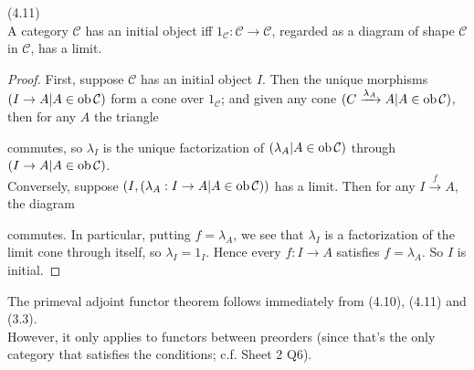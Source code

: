 \documentclass[a4paper]{article}
\begin{document}
\begin{lemma} (4.11)\\
    A category $\mathcal{C}$ has an initial object iff $1_{\mathcal{C}}:\mathcal{C} \to \mathcal{C}$, regarded as a diagram of shape $\mathcal{C}$ in $\mathcal{C}$, has a limit.
    \begin{proof}
        First, suppose $\mathcal{C}$ has an initial object $I$. Then the unique morphisms $(I \to A | A \in \operatorname{ob}\mathcal{C})$ form a cone over $1_{\mathcal{C}}$; and given any cone $(C \xrightarrow{\lambda_A} A |A \in \operatorname{ob}\mathcal{C})$, then for any $A$ the triangle 
        commutes, so $\lambda_I$ is the unique factorization of $(\lambda_A|A \in \operatorname{ob}\mathcal{C})$ through $(I \to A|A\in\operatorname{ob}\mathcal{C})$.\\
        Conversely, suppose $(I,(\lambda_A:I \to A|A \in \operatorname{ob}\mathcal{C}))$ has a limit. Then for any $I \xrightarrow{f} A$, the diagram
        commutes. In particular, putting $f = \lambda_A$, we see that $\lambda_I$ is a factorization of the limit cone through itself, so $\lambda_I = 1_I$. Hence every $f:I \to A$ satisfies $f=\lambda_A$. So $I$ is initial.
    \end{proof}
\end{lemma}

The primeval adjoint functor theorem follows immediately from (4.10), (4.11) and (3.3).\\
However, it only applies to functors between preorders (since that's the only category that satisfies the conditions; c.f. Sheet 2 Q6).
\end{document}
